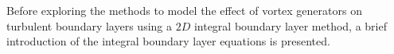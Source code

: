 


Before exploring the methods to model the effect of vortex generators on turbulent boundary layers using a $2D$  integral boundary layer method, a brief introduction of the integral boundary layer equations is presented.
